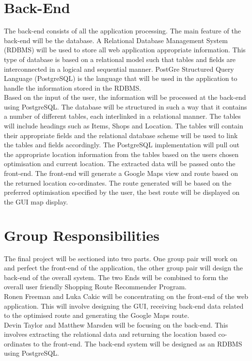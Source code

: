 \documentclass[10pt, a4paper, onecolumn]{scrartcl}
\begin{document}
	\section{Back-End}
	
		The back-end consists of all the application processing. The main feature of the back-end will be the database. A Relational Database Management System (RDBMS) will be used to store all web application appropriate information. This type of database is based on a relational model such that tables and fields are interconnected in a logical and sequential manner. PostGre Structured Query Language (PostgreSQL) is the language that will be used in the application to handle the information stored in the RDBMS. \\
	
		Based on the input of the user, the information will be processed at the back-end using PostgreSQL. The database will be structured in such a way that it contains a number of different tables, each interlinked in a relational manner. The tables will include headings such as Items, Shops and Location. The tables will contain their appropriate fields and the relational database scheme will be used to link the tables and fields accordingly. The PostgreSQL implementation will pull out the appropriate location information from the tables based on the users chosen optimisation and current location. The extracted data will be passed onto the front-end. The front-end will generate a Google Maps view and route based on the returned location co-ordinates. The route generated will be based on the preferred optimisation specified by the user, the best route will be displayed on the GUI map display. 
	
	\section{Group Responsibilities}
	
		The final project will be sectioned into two parts. One group pair will work on and perfect the front-end of the application, the other group pair will design the back-end of the overall system. The two Ends will be combined to form the overall user friendly Shopping Route Recommender Program. \\
		
		Ronen Freeman and Luka Cakic will be concentrating on the front-end of the web application. This will involve designing the GUI, receiving back-end data related to the optimised route and generating the Google Maps route. \\
		
		Devin Taylor and Matthew Marsden will be focusing on the back-end. This involves extracting the relational data  and returning the location based co-ordinates to the front-end. The back-end system will be designed as an RDBMS using PostgreSQL.   
	

	
		
		
\end{document}
